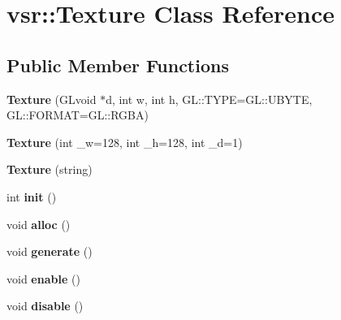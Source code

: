 \hypertarget{classvsr_1_1_texture}{\section{vsr\-:\-:Texture Class Reference}
\label{classvsr_1_1_texture}
}
\subsection*{Public Member Functions}
\begin{DoxyCompactItemize}
\item 
\hypertarget{classvsr_1_1_texture_adcb7f1fe41ecff591ebd07aff4087a82}{{\bfseries Texture} (G\-Lvoid $\ast$d, int w, int h, G\-L\-::\-T\-Y\-P\-E=G\-L\-::\-U\-B\-Y\-T\-E, G\-L\-::\-F\-O\-R\-M\-A\-T=G\-L\-::\-R\-G\-B\-A)}\label{classvsr_1_1_texture_adcb7f1fe41ecff591ebd07aff4087a82}

\item 
\hypertarget{classvsr_1_1_texture_ac6dce67d246dd7f51a14cbf53c9327a2}{{\bfseries Texture} (int \-\_\-w=128, int \-\_\-h=128, int \-\_\-d=1)}\label{classvsr_1_1_texture_ac6dce67d246dd7f51a14cbf53c9327a2}

\item 
\hypertarget{classvsr_1_1_texture_aa7ac1f0eb68bbbd887886f28d2ee3c82}{{\bfseries Texture} (string)}\label{classvsr_1_1_texture_aa7ac1f0eb68bbbd887886f28d2ee3c82}

\item 
\hypertarget{classvsr_1_1_texture_a2654b319a751bfba84c0ca3197465013}{int {\bfseries init} ()}\label{classvsr_1_1_texture_a2654b319a751bfba84c0ca3197465013}

\item 
\hypertarget{classvsr_1_1_texture_a07a1dc5e2d736888c25d6bbd8293a032}{void {\bfseries alloc} ()}\label{classvsr_1_1_texture_a07a1dc5e2d736888c25d6bbd8293a032}

\item 
\hypertarget{classvsr_1_1_texture_aead072946abab4dd58892c737957c165}{void {\bfseries generate} ()}\label{classvsr_1_1_texture_aead072946abab4dd58892c737957c165}

\item 
\hypertarget{classvsr_1_1_texture_aa968b6904a77e9981f1b6fdf0ca509b8}{void {\bfseries enable} ()}\label{classvsr_1_1_texture_aa968b6904a77e9981f1b6fdf0ca509b8}

\item 
\hypertarget{classvsr_1_1_texture_a46eaf65e5eb79adf9e65a025a0020d31}{void {\bfseries disable} ()}\label{classvsr_1_1_texture_a46eaf65e5eb79adf9e65a025a0020d31}


\end{DoxyCompactItemize}
